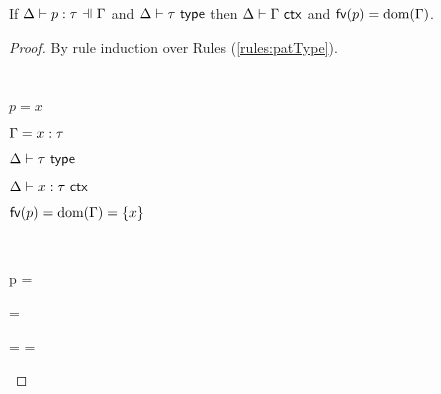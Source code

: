 \begin{grayparbox}
\begin{lemma}\label{lemma:pattern-regularity-UP} 
If $\patType{\pctx}{p}{\tau}$ and $\Delta \vdash \tau~\mathsf{type}$ then $\Delta \vdash \Gamma~\mathsf{ctx}$ and $\mathsf{fv}(p) = \text{dom}(\Gamma)$.
\end{lemma}
\begin{proof} By rule induction over Rules (\ref{rules:patType}).
\begin{byCases}
\item[\text{(\ref{rule:patType-var})}] ~
\begin{pfsteps*}
  \item $p=x$ 
  \item $\Gamma=x : \tau$ 
  \item $\Delta \vdash \tau~\mathsf{type}$ 
  \item $\Delta \vdash x : \tau~\mathsf{ctx}$ 
  \item $\mathsf{fv}(p) = \text{dom}(\Gamma) = \{x\}$ 
 \end{pfsteps*}
 \resetpfcounter
\item[\text{(\ref{rule:patType-wild})}] ~
\begin{pfsteps}
\item p = \aewildp {}
\item \pctx=\emptyset {}
\item \isctxU{\Delta}{\emptyset} 
\item {} = \domof{\Gamma} = \emptyset {}
\end{pfsteps}
\resetpfcounter


\end{byCases}
\end{proof}
\end{grayparbox}
